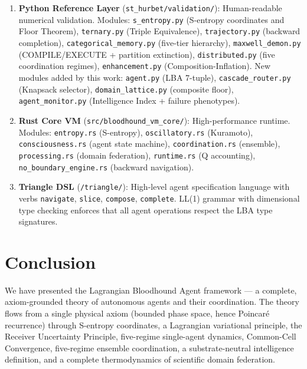 \documentclass[twocolumn,11pt,a4paper]{article}
\theoremstyle{plain}
\theoremstyle{definition}
\theoremstyle{remark}
\begin{document}
\begin{enumerate}
  \item \textbf{Python Reference Layer} (\texttt{st\_hurbet/validation/}): Human-readable numerical validation. Modules: \texttt{s\_entropy.py} (S-entropy coordinates and Floor Theorem), \texttt{ternary.py} (Triple Equivalence), \texttt{trajectory.py} (backward completion), \texttt{categorical\_memory.py} (five-tier hierarchy), \texttt{maxwell\_demon.py} (COMPILE/EXECUTE + partition extinction), \texttt{distributed.py} (five coordination regimes), \texttt{enhancement.py} (Composition-Inflation).  New modules added by this work: \texttt{agent.py} (LBA 7-tuple), \texttt{cascade\_router.py} (Knapsack selector), \texttt{domain\_lattice.py} (composite floor), \texttt{agent\_monitor.py} (Intelligence Index + failure phenotypes).

  \item \textbf{Rust Core VM} (\texttt{src/bloodhound\_vm\_core/}): High-performance runtime. Modules: \texttt{entropy.rs} (S-entropy), \texttt{oscillatory.rs} (Kuramoto), \texttt{consciousness.rs} (agent state machine), \texttt{coordination.rs} (ensemble), \texttt{processing.rs} (domain federation), \texttt{runtime.rs} (Q accounting), \texttt{no\_boundary\_engine.rs} (backward navigation).

  \item \textbf{Triangle DSL} (\texttt{/triangle/}): High-level agent specification language with verbs \texttt{navigate}, \texttt{slice}, \texttt{compose}, \texttt{complete}.  LL(1) grammar with dimensional type checking enforces that all agent operations respect the LBA type signatures.
\end{enumerate}

\section*{Conclusion}

We have presented the Lagrangian Bloodhound Agent framework — a complete, axiom-grounded theory of autonomous agents and their coordination.  The theory flows from a single physical axiom (bounded phase space, hence Poincar\'e recurrence) through S-entropy coordinates, a Lagrangian variational principle, the Receiver Uncertainty Principle, five-regime single-agent dynamics, Common-Cell Convergence, five-regime ensemble coordination, a substrate-neutral intelligence definition, and a complete thermodynamics of scientific domain federation.
\end{document}
